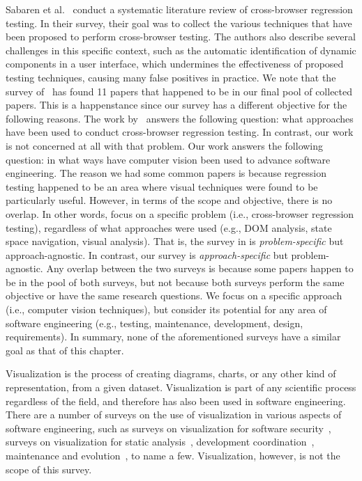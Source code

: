 Sabaren et al.~\cite{Sabaren-2018-JCST} conduct a systematic 
literature review of cross-browser regression testing.
In their survey, their goal was to collect the 
various techniques that 
have been proposed to perform cross-browser testing. 
The authors also describe several 
challenges in this specific context, such as the 
automatic identification of dynamic components in a 
user interface, which undermines the effectiveness of 
proposed testing techniques, causing many false 
positives in practice.
We note that the survey of~\citet{Sabaren-2018-JCST} has  
found 11 papers that happened to be in our final pool of \numberOfPapers 
collected papers. This is a happenstance since our survey 
has a different objective for the following reasons. 
The work by~\citet{Sabaren-2018-JCST} answers the following
question: what approaches have been used to 
conduct cross-browser regression testing.
In contrast, our work is not concerned at all with that problem. 
Our work answers the following question: in what ways have computer 
vision been used to advance software engineering. 
The reason we had some common papers is because regression testing 
happened to be an area where visual techniques were found 
to be particularly useful. 
However, in terms of the scope and objective, there is no overlap.
%
In other words, \citet{Sabaren-2018-JCST} focus on a specific 
problem (i.e., cross-browser regression testing), regardless 
of what approaches were used (e.g., DOM analysis, 
state space navigation, visual analysis). 
That is, the survey in \citet{Sabaren-2018-JCST} is 
\emph{problem-specific} but approach-agnostic. 
In contrast, our survey is \emph{approach-specific} but 
problem-agnostic. Any overlap between the two surveys is because 
some papers happen to be in the pool of both surveys, 
but not because both surveys perform the same objective or have 
the same research questions. 
We focus on a specific approach 
(i.e., computer vision techniques), but consider its 
potential for any area of software engineering 
(e.g., testing, maintenance, development, design, requirements). 
In summary, none of the aforementioned surveys have a similar 
goal as that of this chapter. 

Visualization is the process of creating diagrams, charts, or any other 
kind of representation, from a given dataset. 
Visualization is part of any scientific process regardless of the field, 
and therefore has also been used in software engineering. 
There are a number of surveys on the use of visualization
in various aspects of software engineering,
such as surveys on visualization for software security~\cite{wagner2015survey,zhang2012survey},
surveys on visualization for static analysis~\cite{caserta2010visualization},
development coordination~\cite{storey2005use},
maintenance and evolution~\cite{novais2013software, koschke2003software},
to name a few. 
Visualization, however, is not the scope of this survey. 

